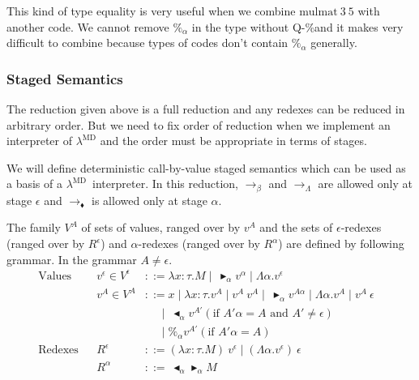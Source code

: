 \documentclass[runningheads]{llncs}
\newcommand{\LMD}{$\lambda^{\textrm{MD}}$\xspace}
\newcommand{\TB}{\blacktriangleright}
\newcommand{\TBL}{\blacktriangleleft}
\newcommand{\QPercent}{\textsc{Q-\%}}
\begin{document}
									This kind of type equality is very useful when we combine $\text{mulmat}\ 3\ 5$ with another code.
									We cannot remove $\%_\alpha$ in the type without \QPercent and it makes very difficult to combine
									because types of codes don't contain $\%_\alpha$ generally.
									
									\subsubsection{Staged Semantics}
									
									The reduction given above is a full reduction and any redexes can be reduced in arbitrary order.
									But we need to fix order of reduction when we implement an interpreter of \LMD and
									the order must be appropriate in terms of stages.
									
									We will define deterministic call-by-value staged semantics which can be used as a basis of a \LMD\ interpreter.
									In this reduction, $\longrightarrow_\beta$ and $\longrightarrow_\Lambda$ are allowed only at stage $\epsilon$ and 
									$\longrightarrow_\blacklozenge$ is allowed only at stage $\alpha$.
									
									\begin{definition}[Values]
										The family $V^A$ of sets of values, ranged over by $v^A$ and 
										the sets of $\epsilon$-redexes (ranged over by $R^\epsilon$) and $\alpha$-redexes (ranged over by $R^\alpha$)
										are defined by following grammar. In the grammar $A \neq \epsilon$.
										\begin{align*}
											\textrm{Values}  &   & v^\epsilon \in V^\epsilon & ::= \lambda x:\tau.M \mid\ \TB_\alpha v^\alpha \mid \Lambda\alpha.v^\epsilon                                       &   \\
											                 &   & v^A \in V^A               & ::= x \mid \lambda x:\tau.v^A \mid v^A\ v^A \mid\ \TB_\alpha v^{A\alpha} \mid \Lambda\alpha.v^A \mid v^A\ \epsilon &   \\
											                 &   &                           & \quad\   \mid\ \TBL_\alpha v^{A'} (\text{if } A'\alpha = A \text{ and } A' \neq \epsilon)                          &   \\
											                 &   &                           & \quad\   \mid \%_\alpha v^{A'} (\text{if } A'\alpha = A)                                                           &   \\
											\textrm{Redexes} &   & R^\epsilon                & ::= (\lambda x:\tau.M)\ v^\epsilon \mid (\Lambda\alpha.v^\epsilon)\ \epsilon                                       &   \\
											                 &   & R^\alpha                  & ::=\ \TBL_\alpha \TB_\alpha M                                                                                      &   \\
										\end{align*}
									\end{definition}
									
\end{document}
